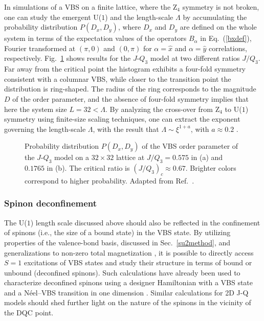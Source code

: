 \documentclass[range]{ar2e}
\begin{document}
In simulations of a VBS on a finite lattice, where the Z$_4$ symmetry is not broken, one can study the emergent U($1$) and the length-scale $\Lambda$ by 
accumulating the probability distribution $P(D_x,D_y)$, where $D_x$ and $D_y$ are defined on the whole system in terms of the expectation values of the 
operators $B_\alpha$ in Eq.~(\ref{bxdef}), Fourier transformed at $(\pi,0)$ and $(0,\pi)$ for $\alpha=\hat x$ and $\alpha=\hat y$ correlations, respectively.
Fig.~\ref{jq3histo} shows results for the $J$-$Q_3$ model at two different ratios $J/Q_3$. Far away from the critical point the histogram exhibits a four-fold
symmetry consistent with a columnar VBS, while closer to the transition point the distribution is ring-shaped. The radius of the ring corresponds
to the magnitude $D$ of the order parameter, and the absence of four-fold symmetry implies that here the system size $L=32 < \Lambda$. By analyzing the
cross-over from Z$_4$ to U($1$) symmetry using finite-size scaling techniques, one can extract the exponent governing the length-scale $\Lambda$, with 
the result that $\Lambda \sim \xi^{1+a}$, with $a \approx 0.2$ \cite{lou2009:sun}.


\begin{figure}
\centerline{}
  \caption{Probability distribution $P(D_x,D_y)$ of the VBS order parameter of the $J$-$Q_3$ model on a $32\times 32$
           lattice at $J/Q_3 = 0.575$ in (a) and $0.1765$ in (b). The critical ratio is $(J/Q_3)_c \approx 0.67$. Brighter colors
           correspond to higher probability. Adapted from Ref.~\cite{lou2009:sun}.}  
\label{jq3histo}
\end{figure}

\subsubsection{Spinon deconfinement}

The U($1$) length scale discussed above should also be reflected in the confinement of spinons (i.e., the size of a bound state) in the VBS state. By utilizing 
properties of the valence-bond basis, discussed in Sec.~\ref{su2method}, and generalizations to non-zero total magnetization \cite{Banerjee10b,Wang10}, it is 
possible to directly access $S=1$ excitations of VBS states and study their structure in terms of bound or unbound (deconfined spinons). Such calculations have 
already been used to characterize deconfined spinons using a designer Hamiltonian with a VBS state and a N\'eel--VBS transition in one dimension \cite{Tang11a}. 
Similar calculations for 2D J-Q models should shed further light on the nature of the spinons in the vicinity of the DQC point.
\end{document}
